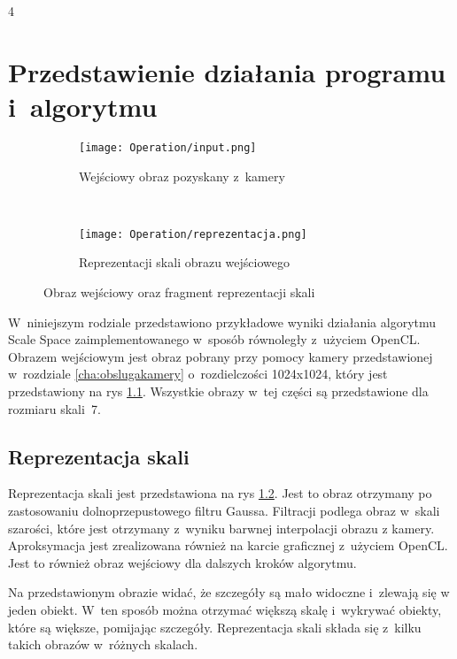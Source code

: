 4
\chapter{Przedstawienie działania programu i~algorytmu}
\label{cha:dzialanie}

\begin{figure}[h]
\begin{center}

\begin{subfigure}[t]{0.3\textwidth}
\texttt{[image: Operation/input.png]}
\caption{Wejściowy obraz pozyskany z~kamery}
\label{fig:input}
\end{subfigure}
~
\begin{subfigure}[t]{0.3\textwidth}
\texttt{[image: Operation/reprezentacja.png]}
\caption{Reprezentacji skali obrazu wejściowego}
\label{fig:dzialanieRep}
\end{subfigure}

\end{center}
\label{fig:inputIDzialanie}
\caption{Obraz wejściowy oraz fragment reprezentacji skali}
\end{figure}

W~niniejszym rodziale przedstawiono przykładowe wyniki działania algorytmu Scale Space zaimplementowanego w~sposób równoległy z~użyciem OpenCL. Obrazem wejściowym jest obraz pobrany przy pomocy kamery przedstawionej w~rozdziale \ref{cha:obslugakamery} o~rozdielczości 1024x1024, który jest przedstawiony na rys \ref{fig:input}. Wszystkie obrazy w~tej części są przedstawione dla rozmiaru skali~7.

\section{Reprezentacja skali}
\label{sec:dzialanieRep}

Reprezentacja skali jest przedstawiona na rys \ref{fig:dzialanieRep}. Jest to obraz otrzymany po zastosowaniu dolnoprzepustowego filtru Gaussa. Filtracji podlega obraz w~skali szarości, które jest otrzymany z~wyniku barwnej interpolacji obrazu z kamery. Aproksymacja jest zrealizowana również na karcie graficznej z~użyciem OpenCL. Jest to również obraz wejściowy dla dalszych kroków algorytmu.

Na przedstawionym obrazie widać, że szczegóły są mało widoczne i~zlewają się w jeden obiekt. W~ten sposób można otrzymać większą skalę i~wykrywać obiekty, które są większe, pomijając szczegóły. Reprezentacja skali składa się z~kilku takich obrazów w~różnych skalach.


